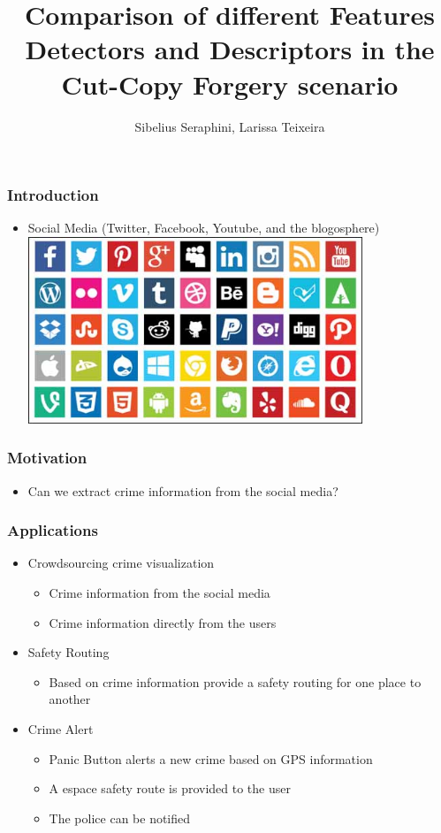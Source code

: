 \documentclass{beamer}
\title[Features]{Comparison of different Features Detectors and Descriptors in the Cut-Copy Forgery scenario}
\institute[CSI 445]{
    CSI 445 - Digital Image Forensics
}
\author[Seraphini,Teixeira]{Sibelius Seraphini, Larissa Teixeira}
\date{}
\begin{document}
    \frame{\titlepage}

    \begin{frame}
        \frametitle{Introduction}
        \begin{itemize}[<+->]
            \item Social Media (Twitter, Facebook, Youtube, and the blogosphere)
            \includegraphics[width=10cm]{social_media}
        \end{itemize}
    \end{frame}


    \begin{frame}
        \frametitle{Motivation}
        \begin{itemize}
            \item Can we extract crime information from the social media?
        \end{itemize}
    \end{frame}

    \begin{frame}
        \frametitle{Applications}
        \begin{itemize} [<+->]
            \item Crowdsourcing crime visualization
                \begin{itemize}
                    \item Crime information from the social media
                    \item Crime information directly from the users
                \end{itemize}
            \item Safety Routing
                \begin{itemize}
                    \item Based on crime information provide a safety routing for one place to another
                \end{itemize}
            \item Crime Alert
                \begin{itemize}
                    \item Panic Button alerts a new crime based on GPS information
                    \item A espace safety route is provided to the user
                    \item The police can be notified
                \end{itemize}
        \end{itemize}
    \end{frame}
\end{document}
